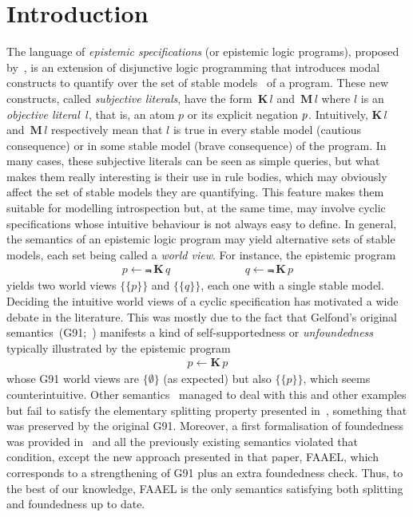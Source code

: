 \documentclass{new_tlp}
\def\K{\mathbf{K}\, }
\def\M{\mathbf{M}\, }
\let\sneg\relax
\newcommand{\sneg}{\ensuremath{\text{-}}}
\begin{document}
\section{Introduction}
\label{sec:intro}

The language of \emph{epistemic specifications} (or epistemic logic programs), proposed by~, is an extension of disjunctive logic programming that introduces modal constructs to quantify over the set of stable models~\cite{gellif88b} of a program.
%
These new constructs, called \emph{subjective literals}, have the form~$\K l$ and~$\M l$ where $l$ is an \emph{objective literal}~$l$, that is, an atom $p$ or its explicit negation $\sneg p$.
%
Intuitively, $\K l$ and~$\M l$ respectively mean that $l$ is true in every stable model (cautious consequence) or in some stable model (brave consequence) of the program.
%
In many cases, these subjective literals can be seen as simple queries, but what makes them really interesting is their use in rule bodies,
which may obviously affect the set of stable models they are quantifying.
%
This feature makes them suitable for modelling introspection but, at the same time, may involve cyclic specifications whose intuitive behaviour is not always easy to define.
%
In general, the semantics of an epistemic logic program may yield alternative sets of stable models, each set being called a \emph{world view}.
%
For instance, the epistemic program
\begin{eqnarray}
p \leftarrow \Not \, \K q \hspace{80pt}
q \leftarrow \Not \, \K p  \label{f:epiloop}
\end{eqnarray}
%
yields two world views $\{\{p\}\}$ and $\{\{q\}\}$, each one with a single stable model.
%
Deciding the intuitive world views of a cyclic specification has motivated a wide debate in the literature.
%
This was mostly due to the fact that Gelfond's original \mbox{semantics (G91;~)} manifests a kind of self-supportedness or \emph{unfoundedness} typically illustrated by the epistemic program
\begin{eqnarray}
p \leftarrow \K p \label{f:selfsupport}
\end{eqnarray}
whose G91 world views are $\{\emptyset\}$ (as expected) but also $\{\{p\}\}$, which seems counterintuitive.
%
Other semantics~\cite{kawabagezh15,faheir15a,sheeit17a} managed to deal with this and other examples but fail to satisfy the elementary splitting property presented in~\cite{cafafa19a}, something that was preserved by the original G91.
%
Moreover, a first formalisation of foundedness was provided in~\cite{cafafa19b} and all the previously existing semantics violated that condition, except the new approach presented in that paper, FAAEL, which corresponds to a strengthening of G91 plus an extra foundedness check.
%
Thus, to the best of our knowledge, FAAEL is the only semantics satisfying both splitting and foundedness up to date.
\end{document}
